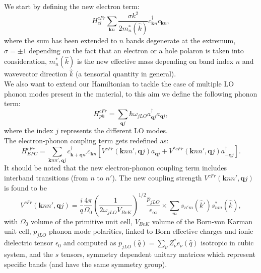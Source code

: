 We start by defining the new electron term:
\begin{equation}
    H^{cFr}_{el}\sum_{\mathbf{k}n}\frac{\sigma k^2}{2m^*_n(\hat{k})}c^\dagger_{\mathbf{k}n}c_{\mathbf{k}n},
    \label{cubic_froehlich_electron}
\end{equation}
where the sum has been extended to $n$ bands degenerate at the extremum, $\sigma=\pm 1$ depending on the fact that an electron or a hole 
polaron is taken into consideration, $m_n^*(\hat{k})$ is the new effective mass depending on band index $n$ and wavevector direction 
$\hat{k}$ (a tensorial quantity in general).\\
We also want to extend our Hamiltonian to tackle the case of multiple LO phonon modes present in the material, to this aim we define the 
following phonon term:
\begin{equation}
    H^{cFr}_{ph}=\sum_{\mathbf{q}j}\hbar\omega_{jLO}a^\dagger_{\mathbf{q}j}a_{\mathbf{q}j},
    \label{cubic_froehlich_phonon}
\end{equation}
where the index $j$ represents the different LO modes.\\
The electron-phonon coupling term gets redefined as:
\begin{equation}
    H^{cFr}_{EPC}=\sum_{\mathbf{k}nn',\mathbf{q}j}c^\dagger_{\mathbf{k}+\mathbf{q}n'}c_{\mathbf{k}n}\left[V^{cFr}(\mathbf{k}nn',\mathbf{q}j)a_{\mathbf{q}j}+V^{*cFr}(\mathbf{k}nn',\mathbf{q}j)a^\dagger_{-\mathbf{q}j}\right].
\end{equation}
It should be noted that the new electron-phonon coupling term includes interband transitions (from $n$ to $n'$). The new coupling strength 
$V^{cFr}(\mathbf{k}nn',\mathbf{q}j)$ is found to be
\begin{equation}
    V^{cFr}(\mathbf{k}nn',\mathbf{q}j)=\frac{i}{q}\frac{4\pi}{\Omega_0}\left(\frac{1}{2\omega_{jLO}V_{BvK}}\right)^{1/2}\frac{p_{jLO}}{\epsilon_\infty}\times \sum_{m}s_{n'm}(\hat{k}')s^*_{nm}(\hat{k}),
\end{equation}
with $\Omega_0$ volume of the primitive unit cell, $V_{BvK}$ volume of the Born-von Karman unit cell, $p_{jLO}$ phonon mode polarities, linked to Born 
effective charges and ionic dielectric tensor $\epsilon_0$ \cite{gonze1997dynamical} and computed as $p_{jLO}(\hat{q})=\sum_\nu Z^*_\nu e_\nu(\hat{q})$ isotropic in cubic 
system, and the $s$ tensors, symmetry dependent unitary matrices which represent specific bands (and have the same symmetry group).
